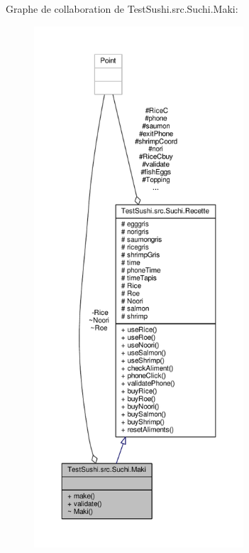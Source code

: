 Graphe de collaboration de Test\+Sushi.\+src.\+Suchi.\+Maki\+:\nopagebreak
\begin{figure}[H]
\begin{center}
\leavevmode
\includegraphics[height=550pt]{classTestSushi_1_1src_1_1Suchi_1_1Maki__coll__graph}
\end{center}
\end{figure}
